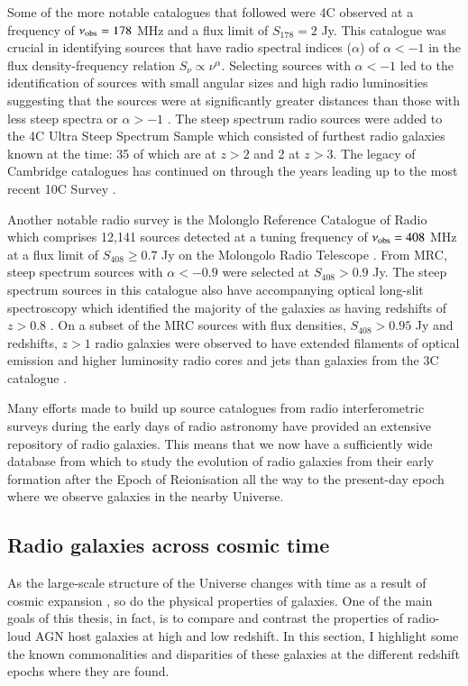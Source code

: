 Some of the more notable catalogues that followed were 4C \citep{PilkingtonScott1965} observed at a frequency of $\nu_{\rm obs} = 178$ MHz and a flux limit of $S_{178} = 2$ Jy. This catalogue was crucial in identifying sources that have radio spectral indices ($\alpha$) of $\alpha < -1$ in the flux density-frequency relation $S_\nu \propto \nu^{\alpha}.$ Selecting sources with $\alpha < -1$ led to the identification of sources with small angular sizes and high radio luminosities suggesting that the sources were at significantly greater distances than those with less steep spectra or $\alpha > -1$ \citep{Tielens1979}. The steep spectrum radio sources were added to the 4C Ultra Steep Spectrum Sample \citep[4C/USS;][]{ChambersMiley1990} which consisted of furthest radio galaxies known at the time: 35 of which are at $z > 2$ and 2 at $z > 3.$ The legacy of Cambridge catalogues has continued on through the years leading up to the most recent 10C Survey  \citep{AMIConsortium2011}. 

Another notable radio survey is the Molonglo Reference Catalogue of Radio \citep[MRC;][]{Large1981} which comprises 12,141 sources detected at a tuning frequency of $\nu_{\rm obs} = 408$ MHz at a flux limit of $S_{408} \geq 0.7$ Jy on the Molongolo Radio Telescope \citep{Hunstead1972}. From MRC, steep spectrum sources with $\alpha < -0.9$ were selected at $S_{408} >0.9$ Jy. The steep spectrum sources in this catalogue also have accompanying optical long-slit spectroscopy which identified the majority of the galaxies as having redshifts of $z > 0.8$ \citep{McCarthy1990}. On a subset of the MRC sources with flux densities, $S_{408} >0.95$ Jy and redshifts, $z > 1$ radio galaxies were observed to have extended filaments of optical emission and higher luminosity radio cores and jets than galaxies from the 3C catalogue \citep{McCarthy1991}. 

Many efforts made to build up source catalogues from radio interferometric surveys during the early days of radio astronomy have provided an extensive repository of radio galaxies. This means that we now have a sufficiently wide database from which to study the evolution of radio galaxies from their early formation after the Epoch of Reionisation all the way to the present-day epoch where we observe galaxies in the nearby Universe. 

\subsection{Radio galaxies across cosmic time}
As the large-scale structure of the Universe changes with time as a result of cosmic expansion \citep{Planck2016}, so do the physical properties of galaxies. One of the main goals of this thesis, in fact, is to compare and contrast the properties of radio-loud AGN host galaxies at high and low redshift. In this section, I highlight some the known commonalities and disparities of these galaxies at the different redshift epochs where they are found.  

